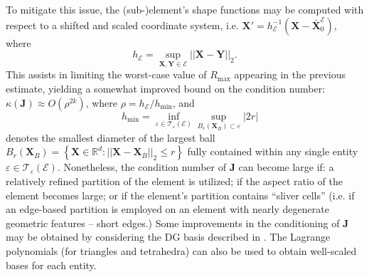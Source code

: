 To mitigate this issue, the (sub-)element's shape functions may be computed with respect to a shifted and scaled coordinate system, i.e. $\mathbf{X}' = h_\mathcal{E}^{-1} (\mathbf{X} - \bar{\mathbf{X}}^{\mathcal{E}}_0)$, where
\begin{equation}
	h_{\mathcal{E}} = \sup_{\mathbf{X}, \mathbf{Y} \in \mathcal{E}} ||\mathbf{X} - \mathbf{Y}||_2.
\end{equation}
This assists in limiting the worst-case value of $R_{\max}$ appearing in the previous estimate, yielding a somewhat improved bound on the condition number: $\kappa (\mathbf{J}) \approx O(\rho^{2k})$, where $\rho = h_{\mathcal{E}} / h_{\min}$, and
\begin{equation}
	\quad h_{\min} = \inf_{\varepsilon \in \mathcal{T}_\varepsilon (\mathcal{E})} \sup_{B_r (\mathbf{X}_B) \subset \varepsilon} |2r|
\end{equation}
denotes the smallest diameter of the largest ball $B_r (\mathbf{X}_B) = \left\{ \mathbf{X} \in \mathbb{R}^d : ||\mathbf{X} - \mathbf{X}_B||_2 \leq r \right\}$ fully contained within any single entity $\varepsilon \in \mathcal{T}_\varepsilon (\mathcal{E})$. Nonetheless, the condition number of $\mathbf{J}$ can become large if: a relatively refined partition of the element is utilized; if the aspect ratio of the element becomes large; or if the element's partition contains ``sliver cells'' (i.e. if an edge-based partition is employed on an element with nearly degenerate geometric features -- short edges.) Some improvements in the conditioning of $\mathbf{J}$ may be obtained by considering the DG basis described in \cite{Bassi:12}. The Lagrange polynomials (for triangles and tetrahedra) can also be used to obtain well-scaled bases for each entity.

